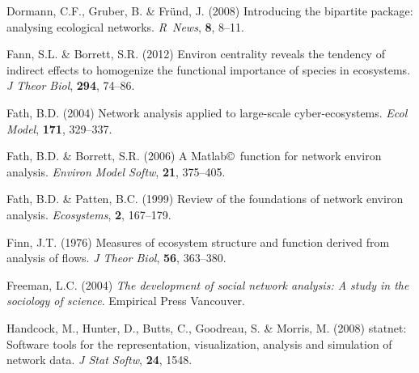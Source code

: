 \documentclass[11pt]{article}
\newcommand{\R}{R}
\begin{document}
\begin{thebibliography}{75}
Dormann, C.F., Gruber, B. \& Fr{\"u}nd, J. (2008) Introducing the bipartite
  package: analysing ecological networks.
\newblock \emph{\R\ News}, \textbf{8}, 8--11.

Fann, S.L. \& Borrett, S.R. (2012) Environ centrality reveals the tendency of
  indirect effects to homogenize the functional importance of species in
  ecosystems.
\newblock \emph{J Theor Biol}, \textbf{294}, 74--86.

Fath, B.D. (2004) Network analysis applied to large-scale cyber-ecosystems.
\newblock \emph{Ecol Model}, \textbf{171}, 329--337.

Fath, B.D. \& Borrett, S.R. (2006) A {Matlab}\copyright\ function for network
  environ analysis.
\newblock \emph{Environ Model Softw}, \textbf{21}, 375--405.

Fath, B.D. \& Patten, B.C. (1999) Review of the foundations of network environ
  analysis.
\newblock \emph{Ecosystems}, \textbf{2}, 167--179.

Finn, J.T. (1976) Measures of ecosystem structure and function derived from
  analysis of flows.
\newblock \emph{J Theor Biol}, \textbf{56}, 363--380.

Freeman, L.C. (2004) \emph{The development of social network analysis: A study
  in the sociology of science}.
\newblock Empirical Press Vancouver.


Handcock, M., Hunter, D., Butts, C., Goodreau, S. \& Morris, M. (2008) statnet:
  Software tools for the representation, visualization, analysis and simulation
  of network data.
\newblock \emph{J Stat Softw}, \textbf{24}, 1548.


\end{thebibliography}
\end{document}
